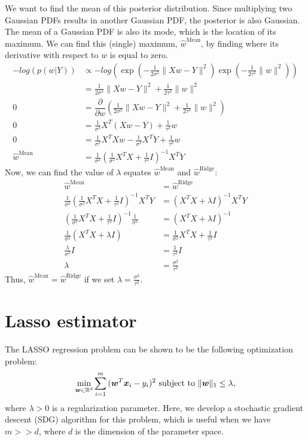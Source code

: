 \documentclass{article}
\begin{document}
We want to find the mean of this posterior distribution.
Since multiplying two Gaussian PDFs results in another Gaussian PDF, the posterior is also Gaussian.
The mean of a Gaussian PDF is also its mode, which is the location of its maximum.
We can find this (single) maximum, $\hat{w}^{\text{Mean}}$, by finding where its derivative with respect to $w$ is equal to zero.
\begin{align*}
    -log(p(w|Y)) &\propto -log\left(\exp\left(-\frac{1}{2\sigma^2}\|Xw - Y\|^2\right)\exp\left(-\frac{1}{2\tau^2}\|w\|^2\right)\right)\\
    &= \frac{1}{2\sigma^2}\|Xw - Y\|^2 + \frac{1}{2\tau^2}\|w\|^2\\
    0 &= \dfrac{\partial}{\partial w}\left(\frac{1}{2\sigma^2}\|Xw - Y\|^2 + \frac{1}{2\tau^2}\|w\|^2\right)\\
    0 &= \frac{1}{\sigma^2}X^T(Xw - Y) + \frac{1}{\tau^2}w\\
    0 &= \frac{1}{\sigma^2}X^TXw - \frac{1}{\sigma^2}X^TY + \frac{1}{\tau^2}w\\
    \hat{w}^{\text{Mean}} &= \frac{1}{\sigma^2}\left(\frac{1}{\sigma^2}X^TX + \frac{1}{\tau^2}I\right)^{-1}X^TY
\end{align*}
Now, we can find the value of \(\lambda\) equates \(\hat{w}^{\text{Mean}}\) and \(\hat{w}^{\text{Ridge}}\):
\begin{align*}
    \hat{w}^{\text{Mean}} &= \hat{w}^{\text{Ridge}}\\
    \frac{1}{\sigma^2}\left(\frac{1}{\sigma^2}X^TX + \frac{1}{\tau^2}I\right)^{-1}X^TY &= (X^T X + \lambda I)^{-1} X^T Y\\
    \left(\frac{1}{\sigma^2}X^TX + \frac{1}{\tau^2}I\right)^{-1}\frac{1}{\sigma^2}&= (X^T X + \lambda I)^{-1}\\
    \frac{1}{\sigma^2} (X^T X + \lambda I)&= \frac{1}{\sigma^2}X^TX + \frac{1}{\tau^2}I\\
    \frac{\lambda}{\sigma^2} I &= \frac{1}{\tau^2}I\\
    \lambda &= \frac{\sigma^2}{\tau^2}
\end{align*}
Thus, $\hat{w}^{\text{Mean}} = \hat{w}^{\text{Ridge}}$ if we set $\lambda = \frac{\sigma^2}{\tau^2}$.

\section{Lasso estimator}

The LASSO regression problem can be shown to be the following optimization problem:
$$\min_{\bm{w} \in \mathbb{R}^d}\sum_{i=1}^m{(\bm{w}^T\bm{x}_i - y_i)^2} \text{ subject to } \|\bm{w}\|_1 \leq \lambda,$$
where $\lambda > 0$ is a regularization parameter.
Here, we develop a stochastic gradient descent (SDG) algorithm for this problem, which is useful when we have $m >> d$, where $d$ is the dimension of the parameter space.
\end{document}

